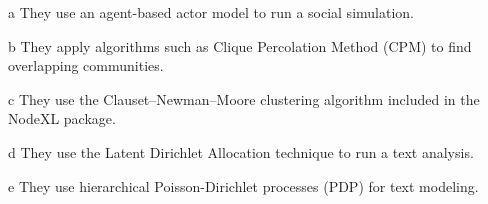 \begin{sidewaystable}
\begin{threeparttable}
\begin{tabular}{ l c c c c c c c c }
  \end{tabular}
  \begin{tablenotes}
\item[a]{They use an agent-based actor model to run a social simulation.}
\item[b]{They apply algorithms such as Clique Percolation Method (CPM) to find overlapping communities.}
\item[c]{They use the Clauset–Newman–Moore clustering algorithm included in the NodeXL package.}
\item[d]{They use the Latent Dirichlet Allocation technique to run a text analysis.}
\item[e]{They use hierarchical Poisson-Dirichlet processes (PDP) for text modeling.}
\end{tablenotes}
\end{threeparttable}
\end{sidewaystable}
